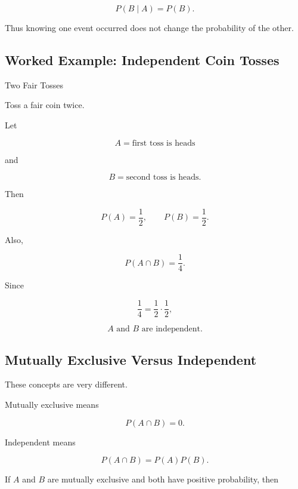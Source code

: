 \[
\boxed{
P(B\mid A)=P(B).
}
\]

Thus knowing one event occurred does not change the probability of the
other.

\subsection{Worked Example: Independent Coin Tosses}
\label{subsec:worked-independent-coins}

\begin{workedexamplebox}{Two Fair Tosses}

Toss a fair coin twice.

Let

\[
A
=
\text{first toss is heads}
\]

and

\[
B
=
\text{second toss is heads}.
\]

Then

\[
P(A)=\frac12,
\qquad
P(B)=\frac12.
\]

Also,

\[
P(A\cap B)=\frac14.
\]

Since

\[
\frac14
=
\frac12\cdot\frac12,
\]

\begin{answerbox}
\[
\boxed{
A\text{ and }B\text{ are independent}.
}
\]
\end{answerbox}

\end{workedexamplebox}

\subsection{Mutually Exclusive Versus Independent}
\label{subsec:exclusive-versus-independent}

These concepts are very different.

Mutually exclusive means

\[
\boxed{
P(A\cap B)=0.
}
\]

Independent means

\[
\boxed{
P(A\cap B)=P(A)P(B).
}
\]

If \(A\) and \(B\) are mutually exclusive and both have positive
probability, then

